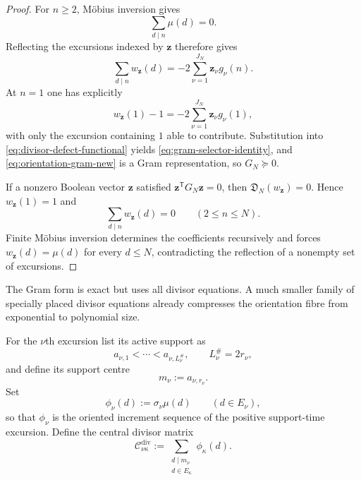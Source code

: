 \documentclass[11pt,reqno]{amsart}
\numberwithin{equation}{section}
\theoremstyle{plain}
\theoremstyle{definition}
\theoremstyle{remark}
\begin{document}
\begin{proof}
For $n\ge2$, M\"obius inversion gives
\begin{equation}
\sum_{d\mid n}\mu(d)=0.
\end{equation}
Reflecting the excursions indexed by $\mathbf z$ therefore gives
\begin{equation}
\sum_{d\mid n}w_\mathbf z(d)
=-2\sum_{\nu=1}^{J_N}\mathbf z_\nu g_\nu(n).
\end{equation}
At $n=1$ one has explicitly
\begin{equation}
w_\mathbf z(1)-1
=-2\sum_{\nu=1}^{J_N}\mathbf z_\nu g_\nu(1),
\end{equation}
with only the excursion containing $1$ able to contribute.  Substitution into \eqref{eq:divisor-defect-functional} yields \eqref{eq:gram-selector-identity}, and \eqref{eq:orientation-gram-new} is a Gram representation, so $G_N\succeq0$.

If a nonzero Boolean vector $\mathbf z$ satisfied $\mathbf z^{\mathsf T}G_N\mathbf z=0$, then $\mathfrak D_N(w_\mathbf z)=0$.  Hence $w_\mathbf z(1)=1$ and
\begin{equation}
\sum_{d\mid n}w_\mathbf z(d)=0\qquad(2\le n\le N).
\end{equation}
Finite M\"obius inversion determines the coefficients recursively and forces $w_\mathbf z(d)=\mu(d)$ for every $d\le N$, contradicting the reflection of a nonempty set of excursions.
\end{proof}

The Gram form is exact but uses all divisor equations.  A much smaller family of specially placed divisor equations already compresses the orientation fibre from exponential to polynomial size.

For the $\nu$th excursion list its active support as
\begin{equation}
a_{\nu,1}<\cdots<a_{\nu,L_\nu^\#},
\qquad L_\nu^\#=2r_\nu,
\end{equation}
and define its support centre
\begin{equation}
m_\nu:=a_{\nu,r_\nu}.
\end{equation}
Set
\begin{equation}
\phi_\nu(d):=\sigma_\nu\mu(d)
\qquad(d\in E_\nu),
\end{equation}
so that $\phi_\nu$ is the oriented increment sequence of the positive support-time excursion.  Define the central divisor matrix
\begin{equation}
\mathscr C^{\mathrm{div}}_{\nu\kappa}
:=
\sum_{\substack{d\mid m_\nu\\ d\in E_\kappa}}
\phi_\kappa(d).
\label{eq:central-divisor-matrix-new}
\end{equation}
\end{document}
